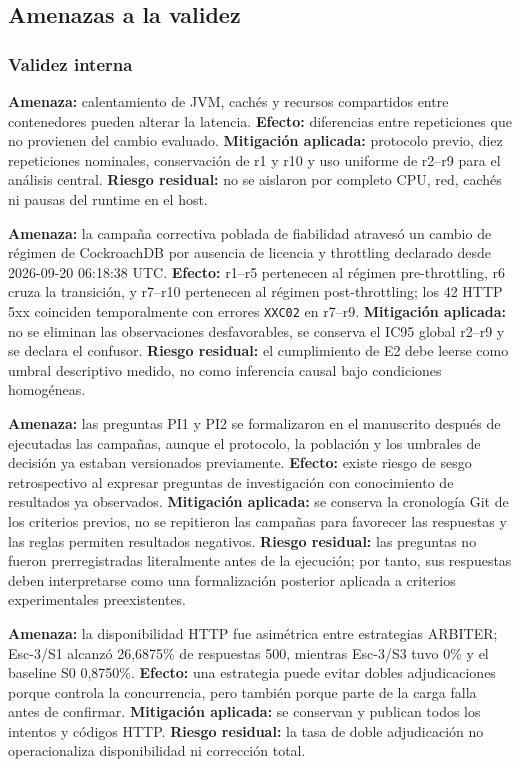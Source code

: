 \subsection{Amenazas a la validez}
\label{subsec:amenazas-validez}

\subsubsection{Validez interna}

\textbf{Amenaza:} calentamiento de JVM, cachés y recursos compartidos entre
contenedores pueden alterar la latencia. \textbf{Efecto:} diferencias entre
repeticiones que no provienen del cambio evaluado. \textbf{Mitigación aplicada:}
protocolo previo, diez repeticiones nominales, conservación de r1 y r10 y uso
uniforme de r2--r9 para el análisis central. \textbf{Riesgo residual:} no se
aislaron por completo CPU, red, cachés ni pausas del runtime en el host.

\textbf{Amenaza:} la campaña correctiva poblada de fiabilidad atravesó un
cambio de régimen de CockroachDB por ausencia de licencia y throttling
declarado desde 2026-09-20 06:18:38 UTC. \textbf{Efecto:} r1--r5 pertenecen al
régimen pre-throttling, r6 cruza la transición, y r7--r10 pertenecen al régimen
post-throttling; los 42 HTTP 5xx coinciden temporalmente con errores
\texttt{XXC02} en r7--r9. \textbf{Mitigación aplicada:} no se eliminan las
observaciones desfavorables, se conserva el IC95 global r2--r9 y se declara el
confusor. \textbf{Riesgo residual:} el cumplimiento de E2 debe leerse como
umbral descriptivo medido, no como inferencia causal bajo condiciones
homogéneas.

\textbf{Amenaza:} las preguntas PI1 y PI2 se formalizaron en el manuscrito
después de ejecutadas las campañas, aunque el protocolo, la población y los
umbrales de decisión ya estaban versionados previamente.
\textbf{Efecto:} existe riesgo de sesgo retrospectivo al expresar preguntas de
investigación con conocimiento de resultados ya observados.
\textbf{Mitigación aplicada:} se conserva la cronología Git de los criterios
previos, no se repitieron las campañas para favorecer las respuestas y las
reglas permiten resultados negativos.
\textbf{Riesgo residual:} las preguntas no fueron prerregistradas literalmente
antes de la ejecución; por tanto, sus respuestas deben interpretarse como una
formalización posterior aplicada a criterios experimentales preexistentes.

\textbf{Amenaza:} la disponibilidad HTTP fue asimétrica entre estrategias
ARBITER; Esc-3/S1 alcanzó 26,6875\% de respuestas 500, mientras Esc-3/S3 tuvo
0\% y el baseline S0 0,8750\%. \textbf{Efecto:} una estrategia puede evitar
dobles adjudicaciones porque controla la concurrencia, pero también porque parte
de la carga falla antes de confirmar. \textbf{Mitigación aplicada:} se conservan
y publican todos los intentos y códigos HTTP. \textbf{Riesgo residual:} la tasa
de doble adjudicación no operacionaliza disponibilidad ni corrección total.

